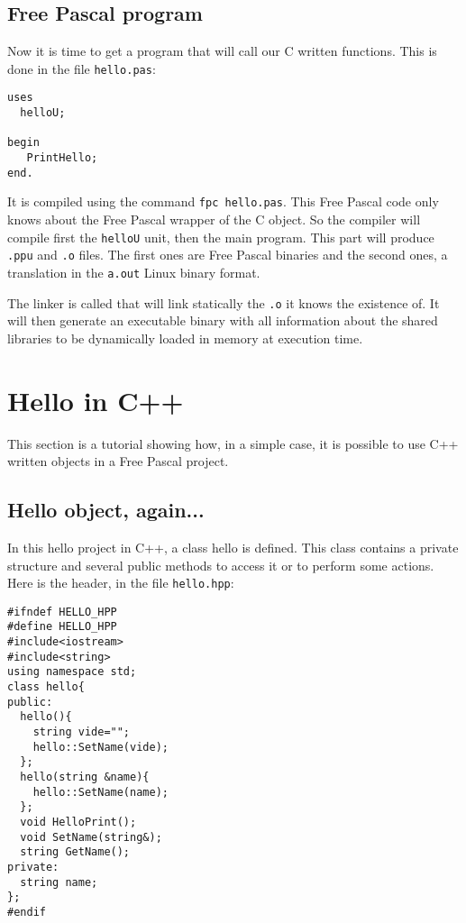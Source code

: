 \documentclass[A4paper]{article}
\begin{document}
\subsection{Free Pascal program}

Now it is time to get a program that will call our C written functions. This
is done in the file \verb|hello.pas|:

\begin{verbatim}
uses
  helloU;

begin
   PrintHello;
end.

\end{verbatim}

It is compiled using the command \verb|fpc hello.pas|. This Free Pascal code
only knows about the Free Pascal wrapper of the C object. So the compiler will
compile first the \verb|helloU| unit, then the main program. This part will
produce \verb|.ppu| and \verb|.o| files. The first ones are Free Pascal
binaries and the second ones, a translation in the \verb|a.out| Linux binary
format.

The linker is called that will link statically the \verb|.o| it knows the
existence of. It will then generate an executable binary with all information
about the shared libraries to be dynamically loaded in memory at execution
time.

\section{Hello in C++}

This section is a tutorial showing how, in a simple case, it is possible to
use C++ written objects in a Free Pascal project.

\subsection{Hello object, again...}

In this hello project in C++, a class hello is defined. This class
contains a private structure and several public methods to access it or to
perform some actions. Here is the header, in the file \verb|hello.hpp|:

\begin{verbatim}
#ifndef HELLO_HPP
#define HELLO_HPP
#include<iostream>
#include<string>
using namespace std;
class hello{
public:
  hello(){
    string vide="";
    hello::SetName(vide);
  };
  hello(string &name){
    hello::SetName(name);
  };
  void HelloPrint();
  void SetName(string&);
  string GetName();
private:
  string name;
};
#endif

\end{verbatim}
\end{document}
